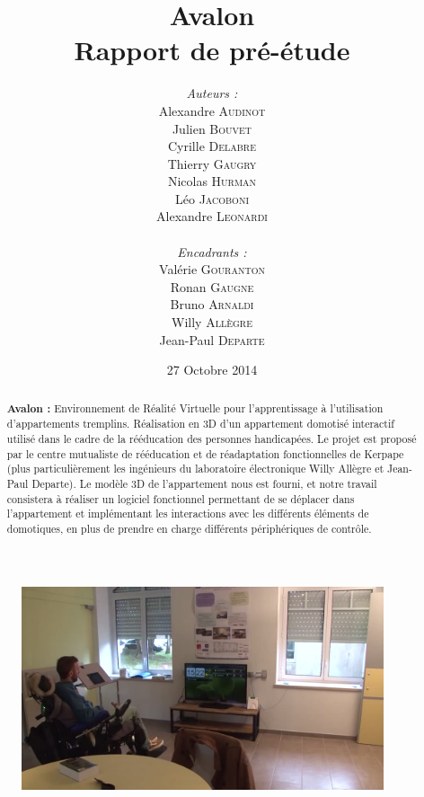 \documentclass[a4paper,11pt]{article}
\title{
  \textbf{Avalon}\\
  Rapport de pré-étude
}
\author{
\begin{minipage}{0.4\textwidth}
	\begin{flushleft} \large
		\emph{Auteurs :}\\
		Alexandre \textsc{Audinot}\\
		Julien \textsc{Bouvet}\\
		Cyrille \textsc{Delabre}\\
		Thierry \textsc{Gaugry}\\
		Nicolas \textsc{Hurman}\\
		Léo \textsc{Jacoboni}\\
		Alexandre \textsc{Leonardi}\\
	\end{flushleft}
\end{minipage}
\begin{minipage}{0.4\textwidth}
	\begin{flushright} \large
		\emph{Encadrants :} \\
		Valérie \textsc{Gouranton}\\
		Ronan \textsc{Gaugne}\\
		Bruno \textsc{Arnaldi}\\
		Willy \textsc{Allègre}\\
		Jean-Paul  \textsc{Departe}\\
	\end{flushright}
\end{minipage}
}
\date{27 Octobre 2014}
\begin{document}
\maketitle
\thispagestyle{empty}
\begin{abstract}
\textbf{Avalon :} Environnement de Réalité Virtuelle pour l'apprentissage à l'utilisation d'appartements tremplins. Réalisation en 3D d'un appartement domotisé interactif utilisé dans le cadre de la rééducation des personnes handicapées.
Le projet est proposé par le centre mutualiste de rééducation et de réadaptation fonctionnelles de Kerpape (plus particulièrement les ingénieurs du laboratoire électronique Willy Allègre et Jean-Paul Departe).
Le modèle 3D de l'appartement nous est fourni, et notre travail consistera à réaliser un logiciel fonctionnel permettant de se déplacer dans l'appartement et implémentant les interactions avec les différents éléments de domotiques, en plus de prendre en charge différents périphériques de contrôle. 
\end{abstract}

\begin{figure}[h!]
	\centering
	\includegraphics[height=170pt]{1-PreEtude/img/screen_appart.png}
\end{figure}
\end{document}
